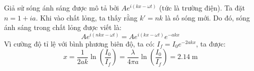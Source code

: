 \begin{solution}
	Giả sử sóng ánh sáng được mô tả bởi $Ae^{i(kx - \omega t)}$ (tức là trường điện). Ta đặt $n = 1 + ia$. Khi vào chất lỏng, ta thấy rằng $k' = nk$ là số sóng mới. Do đó, sóng ánh sáng trong chất lỏng được viết là:
$$Ae^{i(nkx - \omega t)} = Ae^{i(kx- \omega t)}e^{-akx}$$
Vì cường độ tỉ lệ với bình phương biên độ, ta có:
$I_f = I_0 e^{-2akx}$, ta được:
$$x = \frac{1}{2ak}\ln\left(\frac{I_0}{I_f}\right) = \frac{\lambda}{4\pi a}\ln\left(\frac{I_0}{I_f}\right) = \boxed{2.14\;\text{m}}$$
\end{solution}